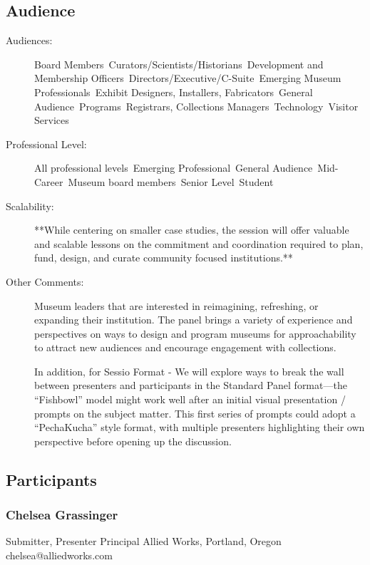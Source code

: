 \documentclass{report}
\begin{document}
              \subsection*{Audience}
                \begin{description}
                  \item [Audiences:]Board Members~Curators/Scientists/Historians~Development and Membership Officers~Directors/Executive/C-Suite~Emerging Museum Professionals~Exhibit Designers, Installers, Fabricators~General Audience~Programs~Registrars, Collections Managers~Technology~Visitor Services~
                  \item[Professional Level:]All professional levels~Emerging Professional~General Audience~Mid-Career~Museum board members~Senior Level~Student~
                \item[Scalability:] **While centering on smaller case studies, the session will offer valuable and scalable lessons on the commitment and coordination required to plan, fund, design, and curate community focused institutions.**

							
              \item[Other Comments:] Museum leaders that are interested in reimagining, refreshing, or expanding their institution. The panel brings a variety of experience and perspectives on ways to design and program museums for approachability to attract new audiences and encourage engagement with collections.

In addition, for Sessio Format - We will explore ways to break the wall between presenters and participants in the Standard Panel format—the “Fishbowl” model might work well after an initial visual presentation / prompts on the subject matter. This first series of prompts could adopt a “PechaKucha” style format, with multiple presenters highlighting their own perspective before opening up the discussion.
              \end{description}
            \subsection*{Participants}
              \subsubsection*{ Chelsea Grassinger }
              Submitter, Presenter\newline
              Principal\newline
              Allied Works, Portland, Oregon
              \newline
              chelsea@alliedworks.com\newline
              
\end{document}
